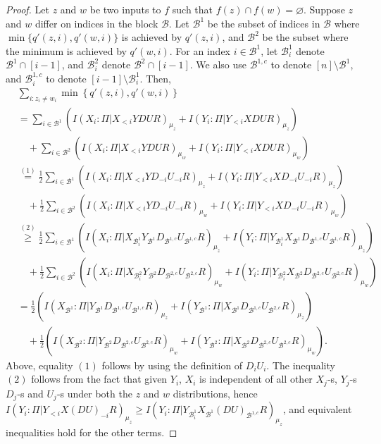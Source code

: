 \documentclass[10pt,a4paper]{article}
\theoremstyle{definition}
\renewcommand{\>}{\rangle}
\newcommand{\<}{\langle}
\newcommand{\cB}{\mathcal{B}}
\begin{document}
\begin{proof}
Let $z$ and $w$ be two inputs to $f$ such that $f(z) \cap f(w) =\varnothing$. Suppose $z$ and $w$ differ on indices in the block $\cB$. Let $\cB^1$ be the subset of indices in $\cB$ where $\min\{q'(z,i),q'(w,i)\}$ is achieved by $q'(z,i)$, and $\cB^2$ be the subset where the minimum is achieved by $q'(w,i)$. For an index $i\in \cB^1$, let $\cB^1_i$ denote $\cB^1 \cap [i-1]$, and $\cB^2_i$ denote $\cB^2 \cap [i-1]$. We also use $\cB^{1,c}$ to denote $[n]\setminus\cB^1$, and $\cB^{1,c}_i$ to denote $[i-1]\setminus\cB^1_i$. Then,
\begin{align}
&\sum_{i: z_i \neq w_i}\min\left\{q'(z,i), q'(w,i)\right\} \nonumber \\
& = \sum_{i\in \cB^1}(I(X_i:\Pi|X_{<i}YDUR)_{\mu_z} + I(Y_i:\Pi|Y_{<i}XDUR)_{\mu_z}) \nonumber \\
& \quad + \sum_{i\in \cB^2}(I(X_i:\Pi|X_{<i}YDUR)_{\mu_w} + I(Y_i:\Pi|Y_{<i}XDUR)_{\mu_w}) \nonumber \\
& \overset{(1)}= \frac{1}{2}\sum_{i\in \cB^1}(I(X_i:\Pi|X_{<i}YD_{-i}U_{-i}R)_{\mu_z} + I(Y_i:\Pi|Y_{<i}XD_{-i}U_{-i}R)_{\mu_z}) \nonumber \\
& \quad + \frac{1}{2}\sum_{i\in \cB^2}(I(X_i:\Pi|X_{<i}YD_{-i}U_{-i}R)_{\mu_w} + I(Y_i:\Pi|Y_{<i}XD_{-i}U_{-i}R)_{\mu_w}) \nonumber \\
& \overset{(2)}\geq \frac{1}{2}\sum_{i\in \cB^1}(I(X_i:\Pi|X_{\cB^1_i}Y_{\cB^1}D_{\cB^{1,c}}U_{\cB^{1,c}}R)_{\mu_z} + I(Y_i:\Pi|Y_{\cB^1_i}X_{\cB^1}D_{\cB^{1,c}}U_{\cB^{1,c}}R)_{\mu_z}) \nonumber \\
& \quad + \frac{1}{2}\sum_{i\in \cB^2}(I(X_i:\Pi|X_{\cB^2_i}Y_{\cB^2}D_{\cB^{2,c}}U_{\cB^{2,c}}R)_{\mu_w} + I(Y_i:\Pi|Y_{\cB^2_i}X_{\cB^2}D_{\cB^{2,c}}U_{\cB^{2,c}}R)_{\mu_w}) \nonumber \\
& = \frac{1}{2}(I(X_{\cB^1}:\Pi|Y_{\cB^1}D_{\cB^{1,c}}U_{\cB^{1,c}}R)_{\mu_z} + I(Y_{\cB^1}:\Pi|X_{\cB^1}D_{\cB^{1,c}}U_{\cB^{2,c}}R)_{\mu_z}) \nonumber \\
& \quad + \frac{1}{2}(I(X_{\cB^2}:\Pi|Y_{\cB^2}D_{\cB^{2,c}}U_{\cB^{2,c}}R)_{\mu_w} + I(Y_{\cB^2}:\Pi|X_{\cB^2}D_{\cB^{2,c}}U_{\cB^{2,c}}R)_{\mu_w}). \label{inf_ineq}
\end{align}
Above, equality $(1)$ follows by using the definition of $D_iU_i$. The inequality $(2)$ follows from the fact that given $Y_i$, $X_i$ is independent of all other $X_j$-s, $Y_j$-s $D_j$-s and $U_j$-s under both the $z$ and $w$ distributions, hence $I(Y_i:\Pi|Y_{<i}X(DU)_{-i}R)_{\mu_z} \geq I(Y_i:\Pi|Y_{\cB^1_i}X_{\cB^1}(DU)_{\cB^{1,c}}R)_{\mu_z}$, and equivalent inequalities hold for the other terms.


\end{proof}
\end{document}
